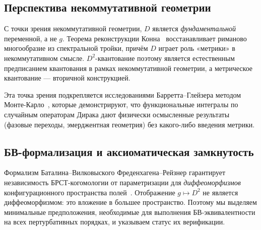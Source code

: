 \documentclass[12pt,a4paper]{article}
\theoremstyle{definition}
\theoremstyle{remark}
\begin{document}
\subsection{Перспектива некоммутативной геометрии}

С точки зрения некоммутативной геометрии, $D$ является
\emph{фундаментальной} переменной, а не $g$.  Теорема реконструкции
Конна~\cite{Connes:2008vs} восстанавливает риманово многообразие из
спектральной тройки, причём $D$ играет роль «метрики» в
некоммутативном смысле.  $D^2$-квантование поэтому является
естественным предписанием квантования в рамках некоммутативной
геометрии, а метрическое квантование --- вторичной конструкцией.

Эта точка зрения подкрепляется исследованиями Барретта--Глейзера методом
Монте-Карло~\cite{Barrett:2016monte}, которые демонстрируют, что
функциональные интегралы по случайным операторам Дирака дают физически
осмысленные результаты (фазовые переходы, эмерджентная геометрия) без
какого-либо введения метрики.

\subsection{БВ-формализация и аксиоматическая замкнутость}
\label{sec:bv_axiomatic}

Формализм Баталина--Вилковыского Фреденхагена--Рейзнер гарантирует
независимость БРСТ-когомологии от параметризации для
\emph{диффеоморфизмов} конфигурационного пространства
полей~\cite{Fredenhagen:2011bv, Fredenhagen:2012classical, Rejzner:2016book}.
Отображение $g \mapsto D^2$ не является диффеоморфизмом: это вложение
в большее пространство.  Поэтому мы выделяем минимальные
предположения, необходимые для выполнения БВ-эквивалентности на всех
пертурбативных порядках, и указываем статус их верификации.
\end{document}
